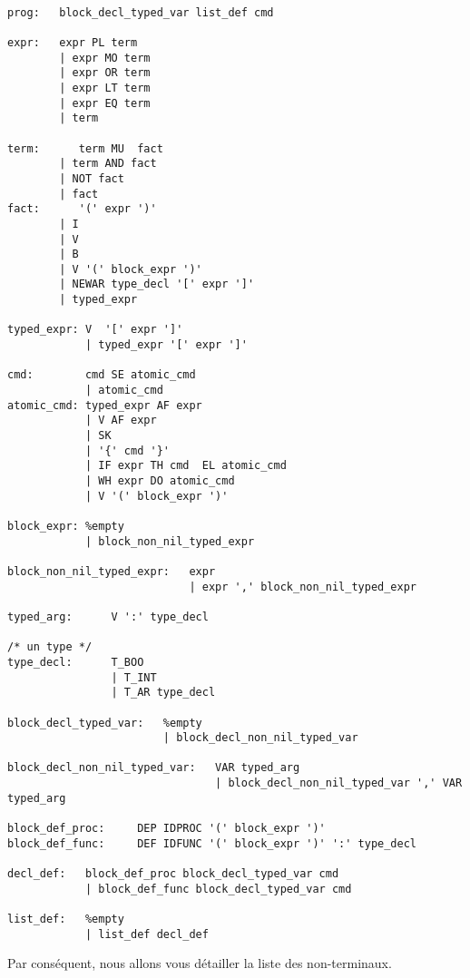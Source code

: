 \documentclass[11pt,a4paper]{article}
\begin{document}
\begin{verbatim}

prog:   block_decl_typed_var list_def cmd  

expr:   expr PL term   
        | expr MO term 
        | expr OR term 
        | expr LT term 
        | expr EQ term 
        | term         

term:      term MU  fact     
        | term AND fact   
        | NOT fact     
        | fact         
fact:      '(' expr ')'                  
        | I                             
        | V                             
        | B                             
        | V '(' block_expr ')'          
        | NEWAR type_decl '[' expr ']'  
        | typed_expr                    

typed_expr: V  '[' expr ']'             
            | typed_expr '[' expr ']'   

cmd:        cmd SE atomic_cmd   
            | atomic_cmd        
atomic_cmd: typed_expr AF expr                  
            | V AF expr                         
            | SK                                
            | '{' cmd '}'                       
            | IF expr TH cmd  EL atomic_cmd     
            | WH expr DO atomic_cmd             
            | V '(' block_expr ')'              

block_expr: %empty                      
            | block_non_nil_typed_expr  

block_non_nil_typed_expr:   expr                                
                            | expr ',' block_non_nil_typed_expr 

typed_arg:      V ':' type_decl         

/* un type */
type_decl:      T_BOO               
                | T_INT             
                | T_AR type_decl    

block_decl_typed_var:   %empty                          
                        | block_decl_non_nil_typed_var  

block_decl_non_nil_typed_var:   VAR typed_arg                                       
                                | block_decl_non_nil_typed_var ',' VAR typed_arg    

block_def_proc:     DEP IDPROC '(' block_expr ')'               
block_def_func:     DEF IDFUNC '(' block_expr ')' ':' type_decl 

decl_def:   block_def_proc block_decl_typed_var cmd     
            | block_def_func block_decl_typed_var cmd   

list_def:   %empty              
            | list_def decl_def 

\end{verbatim}
\pagebreak
Par conséquent, nous allons vous détailler la liste des non-terminaux.
\end{document}
